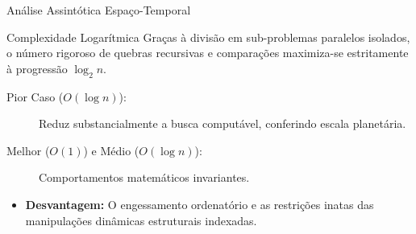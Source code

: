 \documentclass{beamer}
\begin{document}
\begin{frame}{Análise Assintótica Espaço-Temporal}
\begin{block}{Complexidade Logarítmica}
Graças à divisão em sub-problemas paralelos isolados, o número rigoroso de quebras recursivas e comparações maximiza-se estritamente à progressão $\log_2 n$.
\begin{description}
    \item[Pior Caso ($O(\log n)$):] Reduz substancialmente a busca computável, conferindo escala planetária.
    \item[Melhor ($O(1)$) e Médio ($O(\log n)$):] Comportamentos matemáticos invariantes.
\end{description}
\end{block}
\pause
\vspace{0.2cm}
\begin{itemize}
    \item \textbf{Desvantagem:} O engessamento ordenatório e as restrições inatas das manipulações dinâmicas estruturais indexadas.
\end{itemize}
\end{frame}





\section{}
\begin{frame}
\titlepage
\end{frame}
\end{document}
